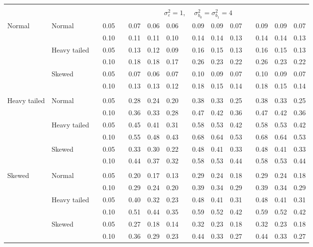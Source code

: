 \documentclass{article} %
\begin{document}
\begin{table}[ht]
\begin{scriptsize}
\begin{center}
\begin{tabular}{ll p{.1cm} c p{.1cm} rrr p{.1cm} rrr p{.1cm} rrr}
&&&&&&&&&&&&&&&\\
& && && \multicolumn{9}{c}{$\sigma_{\varepsilon}^2 = 1$, \ \ $\sigma_{b_0}^2 = \sigma_{b_1}^2 = 4$} \\ \cline{6-16}
Normal       & Normal       && 0.05 &&  0.07 & 0.06 & 0.06 && 0.09 & 0.09 & 0.07 && 0.09 & 0.09 & 0.07 \\ 
             &              && 0.10 &&  0.11 & 0.11 & 0.10 && 0.14 & 0.14 & 0.13 && 0.14 & 0.14 & 0.13 \\ 
             & Heavy tailed && 0.05 &&  0.13 & 0.12 & 0.09 && 0.16 & 0.15 & 0.13 && 0.16 & 0.15 & 0.13 \\ 
             &              && 0.10 &&  0.18 & 0.18 & 0.17 && 0.26 & 0.23 & 0.22 && 0.26 & 0.23 & 0.22 \\ 
             & Skewed       && 0.05 &&  0.07 & 0.06 & 0.07 && 0.10 & 0.09 & 0.07 && 0.10 & 0.09 & 0.07 \\ 
             &              && 0.10 &&  0.13 & 0.13 & 0.12 && 0.18 & 0.15 & 0.14 && 0.18 & 0.15 & 0.14 \\ 
             &&&&&&&&&&&&&&&\\
Heavy tailed & Normal       && 0.05 &&  0.28 & 0.24 & 0.20 && 0.38 & 0.33 & 0.25 && 0.38 & 0.33 & 0.25 \\ 
             &              && 0.10 &&  0.36 & 0.33 & 0.28 && 0.47 & 0.42 & 0.36 && 0.47 & 0.42 & 0.36 \\ 
             & Heavy tailed && 0.05 &&  0.45 & 0.41 & 0.31 && 0.58 & 0.53 & 0.42 && 0.58 & 0.53 & 0.42 \\ 
             &              && 0.10 &&  0.55 & 0.48 & 0.43 && 0.68 & 0.64 & 0.53 && 0.68 & 0.64 & 0.53 \\ 
             & Skewed       && 0.05 &&  0.33 & 0.30 & 0.22 && 0.48 & 0.41 & 0.33 && 0.48 & 0.41 & 0.33 \\ 
             &              && 0.10 &&  0.44 & 0.37 & 0.32 && 0.58 & 0.53 & 0.44 && 0.58 & 0.53 & 0.44 \\ 
             &&&&&&&&&&&&&&&\\
Skewed       & Normal       && 0.05 &&  0.20 & 0.17 & 0.13 && 0.29 & 0.24 & 0.18 && 0.29 & 0.24 & 0.18 \\ 
             &              && 0.10 &&  0.29 & 0.24 & 0.20 && 0.39 & 0.34 & 0.29 && 0.39 & 0.34 & 0.29 \\ 
             & Heavy tailed && 0.05 &&  0.40 & 0.32 & 0.23 && 0.48 & 0.41 & 0.31 && 0.48 & 0.41 & 0.31 \\ 
             &              && 0.10 &&  0.51 & 0.44 & 0.35 && 0.59 & 0.52 & 0.42 && 0.59 & 0.52 & 0.42 \\ 
             & Skewed       && 0.05 &&  0.27 & 0.18 & 0.14 && 0.32 & 0.23 & 0.18 && 0.32 & 0.23 & 0.18 \\ 
             &              && 0.10 &&  0.36 & 0.29 & 0.23 && 0.44 & 0.33 & 0.27 && 0.44 & 0.33 & 0.27 \\ 



\end{tabular}
\end{center}
\end{scriptsize}
\end{table}
\end{document}
